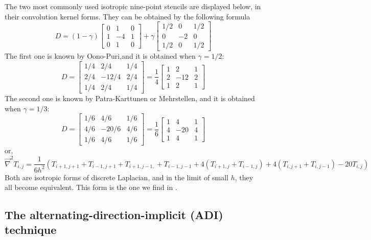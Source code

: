 The two most commonly used isotropic nine-point stencils are displayed below, in their convolution kernel forms. They can be obtained by the following formula
\[
D = (1-\gamma) 
\left[
\begin{array}{ccc}
0 &1 &0 \\
1 &-4 &1 \\
0 &1 &0
\end{array}
\right]
+\gamma
\left[
\begin{array}{ccc}
1/2 &0 & 1/2 \\
0 & -2 & 0 \\
1/2 &0 & 1/2 
\end{array}
\right]
\]
The first one is known by Oono-Puri,and it is obtained when $\gamma=1/2$:
\[
D=
\left[
\begin{array}{ccc}
1/4 & 2/4 & 1/4 \\
2/4 &-12/4 & 2/4 \\
1/4 & 2/4 & 1/4 
\end{array}
\right]
=
\frac14
\left[
\begin{array}{ccc}
1 & 2 & 1 \\
2 &-12 & 2 \\
1 & 2 & 1 
\end{array}
\right]
\]
The second one is known by Patra-Karttunen or Mehrstellen, and it is obtained when $\gamma=1/3$:
\[
D=
\left[
\begin{array}{ccc}
1/6 & 4/6 & 1/6 \\
4/6 & -20/6 & 4/6 \\
1/6 & 4/6 & 1/6 
\end{array}
\right]
=
\frac16
\left[
\begin{array}{ccc}
1 & 4 & 1 \\
4 & -20 & 4 \\
1 & 4 & 1 
\end{array}
\right]
\]
or,
\[
\vec\nabla^2 T_{i,j} = \frac{1}{6h^2} (T_{i+1,j+1} + T_{i-1,j+1} + T_{i+1,j-1,} + T_{i-1,j-1}
+4 (T_{i+1,j}+T_{i-1,j})
+4 (T_{i,j+1}+T_{i,j-1})
-20 T_{i,j} )
\]
Both are isotropic forms of discrete Laplacian, and in the limit of small $h$, they all become equivalent. This form is the one we find in \textcite[p64]{leveque}.

\subsection{The alternating-direction-implicit (ADI) technique}

